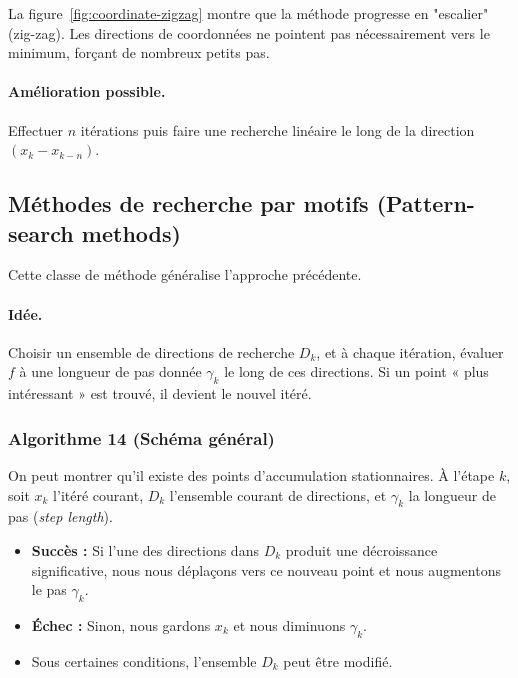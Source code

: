 \begin{figureexplanation}
La figure~\ref{fig:coordinate-zigzag} montre que la méthode progresse en "escalier" (zig-zag). Les directions de coordonnées ne pointent pas nécessairement vers le minimum, forçant de nombreux petits pas.
\end{figureexplanation}

\paragraph{Amélioration possible.}
Effectuer $n$ itérations puis faire une recherche linéaire le long de la direction $(x_k - x_{k-n})$.

\subsection{Méthodes de recherche par motifs (Pattern-search methods)}

Cette classe de méthode généralise l'approche précédente.

\paragraph{Idée.}
Choisir un ensemble de directions de recherche $D_k$, et à chaque itération, évaluer $f$ à une longueur de pas donnée $\gamma_k$ le long de ces directions.
Si un point « plus intéressant » est trouvé, il devient le nouvel itéré.

\subsubsection{Algorithme 14 (Schéma général)}
On peut montrer qu'il existe des points d'accumulation stationnaires.
À l'étape $k$, soit $x_k$ l'itéré courant, $D_k$ l'ensemble courant de directions, et $\gamma_k$ la longueur de pas (\textit{step length}).

\begin{itemize}
    \item \textbf{Succès :} Si l'une des directions dans $D_k$ produit une décroissance significative, nous nous déplaçons vers ce nouveau point et nous augmentons le pas $\gamma_k$.
    \item \textbf{Échec :} Sinon, nous gardons $x_k$ et nous diminuons $\gamma_k$.
    \item Sous certaines conditions, l'ensemble $D_k$ peut être modifié.
\end{itemize}

